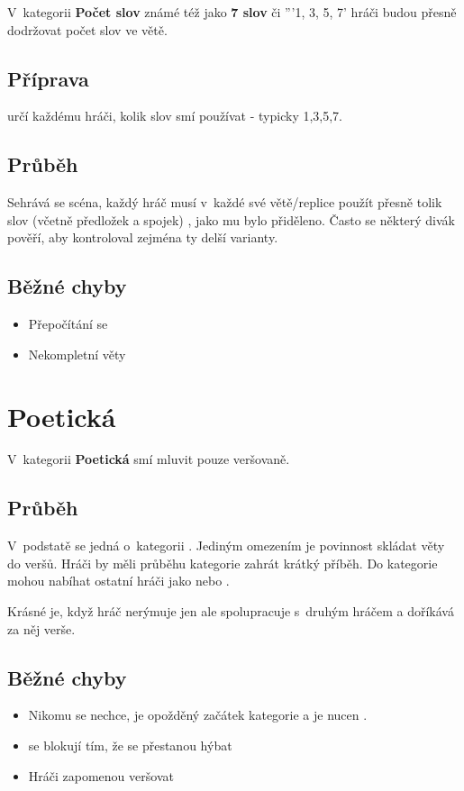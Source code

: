  
V~kategorii \textbf{Počet slov} známé též jako \textbf{7 slov} či '''1, 3, 5, 7' hráči  budou přesně dodržovat počet slov ve větě. 
\subsection{Příprava}  určí každému hráči, kolik slov smí používat - typicky 1,3,5,7.  
 
\subsection{Průběh} Sehrává se scéna, každý hráč musí v~každé své větě/replice použít přesně tolik slov (včetně předložek a spojek) , jako mu bylo přiděleno. 
Často se některý divák pověří, aby kontroloval zejména ty delší varianty. 
 
 
\subsection{ Běžné chyby } \begin{itemize}
\item  Přepočítání se
\item  Nekompletní věty
\end{itemize}
 
 
 
\needspace{5cm} \section{Poetická} \label{poetická}  
 
V~kategorii \textbf{Poetická} smí  mluvit pouze veršovaně. 
 
\subsection{ Průběh } V~podstatě se jedná o~kategorii . Jediným omezením  je povinnost skládat věty do veršů. Hráči by měli průběhu kategorie zahrát krátký příběh. 
Do kategorie mohou nabíhat ostatní hráči jako  nebo . 
 
Krásné je, když hráč nerýmuje jen   ale spolupracuje s~druhým hráčem a doříkává za něj verše. 
 
\subsection{ Běžné chyby } \begin{itemize}
\item Nikomu se nechce, je opožděný začátek kategorie a  je nucen  .
\item {} se blokují tím, že se přestanou hýbat
\item Hráči zapomenou veršovat
\end{itemize}
 
